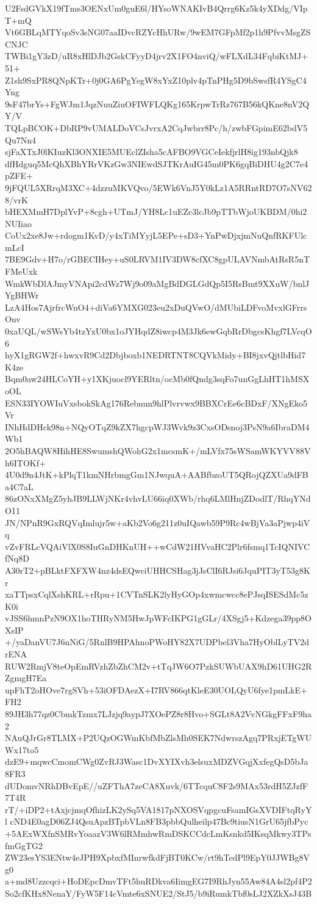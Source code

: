 U2FsdGVkX19fTms3OENxUm0guE6l/HYsoWNAKIvB4Qrrg6Kz5k4yXDdg/VIpT+mQ
Vt6GBLqMTYqoSv3sNG07aaIDvcRZYcHhURw/9wEM7GFpMf2p1h9PfvvMsgZSCNJC
TWBi1gY3zD/uR8xHlDJb2GskCFyyD4jrv2X1FO4nviQ/wFLXdL34FqbiKtMJ+51+
Z1sh9SxPR8QNpKTr+0j0GA6PgYegW8xYxZ10plv4pTnPHg5D9bSwsfR4YSgC4Yng
9sF47brYs+FgWJm1JqzNuuZiuOFIWFLQKg165KrpwTrRz767B56kQKne8nV2QY/V
TQLpBCOK+DbRP9vUMALDoVCsJvrxA2CqJwbrr8Pc/h/zwbFGpimE62bdV5Qu7Nn4
sjFaXTxJ0lKIuzKl3ONXIE5MUEclZIsha5cAFBO9VGCeIekfjrlH8ig193nbQjk8
dfHdguq5McQhXBhYRrVKzGw3NIEwdSJTKrAuIG45m0PK6gqBiDHU4g2C7e4pZFE+
9jFQUL5XRrqM3XC+4dzzuMKVQvo/5EWk6VnJ5Y0kLz1A5RRntRD7O7sNV628/vrK
bHEXMmH7DplYvP+8cgh+UTmJ/YH8Lc1uEZc3lcJb9pTTbWjoUKBDM/0hi2NUIiao
CoUx2xe8Jw+rdogm1KvD/y4xTiMYyjL5EPe+sD3+YnPwDjxjmNuQnfRKFUlcmLcI
7BE9Gdv+H7o/rGBECIHey+uS0LRVM1IV3DW8cfXC8gpULAVNmbAtRsR5nTFMeUxk
WmkWbDlAJmyVNApi2cdWz7Wj9o09aMgBdDGLGdQp5I5RsBmt9XXuW/bnlJYgBHWr
LzA4Hos7AjrfrcWnO4+diVa6YMXG023eu2xDuQVwO/dMUbiLDFvoMvxlGFrrsOnv
0xaUQL/wSWsYb4tzYxU0bx1oJYHqdZ8iwcp4M3Jk6ewGqbRrDbgcsKhgf7LVcqO6
hyX1gRGW2f+hwxvR9Cd2Dbjboxb1NEDRTNT8CQVkMidy+BI8jxvQjtlbHid7K4ze
Bqm0aw24HLCoYH+y1XKjuocl9YERltn/ocMb0fQndg3sqFo7unGgLhHT1hMSXoOL
ESN33IYOWIuVxsbokSkAg176Rebnun9hlPlvrvwx9BBXCrEe6cBDxF/XNgEko5Vr
INhHdDHck98n+NQyOTqZ9kZX7hgcpWJ3Wvk9z3CxsODsnoj3PsN9a6IbraDM4Wb1
2O5hBAQW8HihHE8SwumshQWohG2x1mcsmK+/mLVfx75sWSamWKYVV88Vh6ITOKf+
4U0d9n4JtK+kPlqT1kmNHrbmgGm1NJwquA+AABfbzoUT5QRojQZXUa9dFBa4C7aL
86zONxXMgZ5yhJB9LLWjNKr4vhvLU66iq0XWb/rhq6LMlHnjZDodlT/RhqYNdO11
JN/NPnR9GxRQVqImlujr5w+aKb2Vo6g211z0uIQawb59P9Rc4wBjVa3aPjwp4iVq
vZvFRLcVQAiVlX0S8IuGnDHKnUH++wCdW21HVvaHC2Plr6fsmq1TcIQNIVCfNq8D
A30rT2+pBLktFXFXW4nz4dsEQwciUHHCSHag3jJsClI6RJsi6JquPIT3yT53g8Kr
xaTTpsxCqlXshKRL+rRpu+1CVTnSLK2lyHyGOp4xwmcwcc8ePJsqISESdMc5zK0i
vJSS6hmnPzN9OX1hoTHRyNM5HwJpWFcIKPG1gGLr/4XSgj5+Kdzega39pp8OXsIP
+/yaDanVU7J6nNiG/5RnlB9HPAhnoPWoHY82X7UDPbel3Vha7HyOblLyTV2drENA
RUW2RmjV8teOpEmRVzhZbZhCM2v+tTqJW6O7PzkSUWbUAX9hD61UHG2RZgmgH7Ea
upFhT2oHOve7rgSVh+53iOFDAezX+I7RV866qtKleE30UOLQyU6fye1pmLkE+FH2
89JH3h77qz0CbmkTzmx7LJzjq9aypJ7XOePZ8r8Hvo+SGLt8A2VvNGkgFFxF9ha2
NAuQJrGr8TLMX+P2UQzOGWmKbfMbZlsMh0SEK7NdwrszAgq7PRxjETgWUWx17to5
dzE9+mqwcCmomCWg0ZvRJ3Wasc1DvXYIXvh3elsuxMDZVGqjXxfegQsD5bJa8FR3
dUDomvNRhDBvEpE//uZFThA7zeCA8Xuvk/6TTcquC8F2s9MAx53rdH5ZJzfF7T4R
rT/+iDP2+tAxjcjmqOfhizLK2ySq5VA1817pNXOSVqpgcuFsamIGsXVDIFtqRyYl
cND4E0agD06ZJ4QsuApzBTpbVLn8FB3pbbQulheilp47Bc9tiusN1GrU65jfbPyc
+5AExWXfnSMRvYoaazV3W6lRMmhwRmDSKCCdcLmKsnkd5IKsqMkwy3TPsfmGgTG2
ZW23esYS3ENtw4eJPH9XpbxfMInrwfkdFjBT0KCw/rt9hTedPl9EpY0JJWBg8Vg0
a+md8Uzzcqci+HoDEpcDmvTFt5huRDkva6IimgEG7I9RhJyn55Aw84A4sl2pf4P2
So2cfKHx8NenaY/FyW5F14cVmte6xSNUE2/StJ5/b9iRumkTbf0sLJ2XZkXsJ43B

